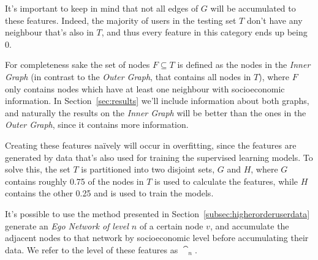 It's important to keep in mind that not all edges of $G$ will be accumulated to these features. Indeed, the majority of users in the testing set $T$ don't have any neighbour that's also in $T$, and thus every feature in this category ends up being $0$.

For completeness sake the set of nodes $F \subseteq T$ is defined as the nodes in the \emph{Inner Graph} (in contrast to the \emph{Outer Graph}, that contains all nodes in $T$), where $F$ only contains nodes which have at least one neighbour with socioeconomic information. In Section~\ref{sec:results} we'll include information about both graphs, and naturally the results on the \emph{Inner Graph} will be better than the ones in the \emph{Outer Graph}, since it contains more information.

Creating these features naïvely will occur in overfitting, since the features are generated by data that's also used for training the supervised learning models. To solve this, the set $T$ is partitioned into two disjoint sets, $G$ and $H$, where $G$ contains roughly 0.75 of the nodes in $T$ is used to calculate the features, while $H$ contains the other 0.25 and is used to train the models.

It's possible to use the method presented in Section~\ref{subsec:higherorderuserdata} generate an \emph{Ego Network of level $n$} of a certain node $v$, and accumulate the adjacent nodes to that network by socioeconomic level before accumulating their data. We refer to the level of these features as $\cat_n$.
